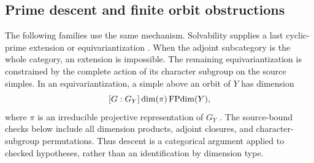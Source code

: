 \subsection{Prime descent and finite orbit obstructions}
\label{sec:prime-descent}
The following families use the same mechanism. Solvability supplies a
last cyclic-prime extension or equivariantization
\cite[Theorem~1.6 and Proposition~4.4]{ENOSolvable}. When the adjoint
subcategory is the whole category, an extension is impossible. The
remaining equivariantization is constrained by the complete action of
its character subgroup on the source simples. In an equivariantization,
a simple above an orbit of $Y$ has dimension
\[
 [G:G_Y]\dim(\pi)\operatorname{FPdim}(Y),
\]
where $\pi$ is an irreducible projective representation of $G_Y$
\cite[Section~2]{BurciuNatale}. The source-bound checks below include
all dimension products, adjoint closures, and character-subgroup
permutations. Thus descent is a categorical argument applied to
checked hypotheses, rather than an identification by dimension type.

